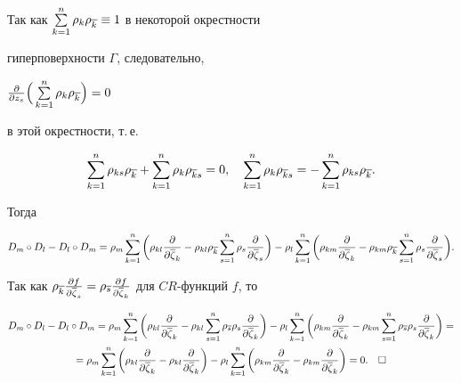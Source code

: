 Так как $\sum\limits_{k=1}^n\rho_k\rho_{\overline k}\equiv1$ в некоторой окрестности


гиперповерхности $\Gamma$, следовательно,\linebreak


$\frac{\partial}{\partial z_s}\Big(\sum\limits_{k=1}^n\rho_k\rho_{\ovl k}


\Big)=0$


в этой окрестности, т.\,е.


$$


\sum_{k=1}^n\rho_{ks}\rho_{\ovl k}+\sum_{k=1}^n\rho_k\rho_{\ovl ks}=0,\quad


\sum_{k=1}^n\rho_k\rho_{\ovl ks}=-\sum_{k=1}^n\rho_{ks}\rho_{\ovl k}.


$$


Тогда


$$


D_m\circ D_l-D_l\circ D_m=


\rho_m\sum_{k=1}^n\bigg(\rho_{kl}\frac{\partial}{\partial\ovl\zeta_k}


-\rho_{kl}\rho_{\ovl k}\sum_{s=1}^n\rho_s\frac{\partial}{\partial\ovl\zeta_s}


\bigg)-


\rho_l\sum_{k=1}^n\bigg(\rho_{km}\frac{\partial}{\partial\ovl\zeta_k}


-\rho_{km}\rho_{\ovl k}\sum_{s=1}^n\rho_s\frac{\partial}{\partial\ovl\zeta_s}


\bigg).


$$


Так как $\rho_{\ovl k}\frac{\partial f}{\partial\ovl\zeta_s}=\rho_{\ovl s}


\frac{\partial f}{\partial\ovl\zeta_k}$ для $CR$-функций $f$, то


\begin{multline*}


D_m\circ D_l-D_l\circ D_m=


\rho_m\sum_{k=1}^n\bigg(\rho_{kl}\frac{\partial}{\partial\ovl\zeta_k}


-\rho_{kl}\sum_{s=1}^n\rho_{\ovl s}\rho_s\frac{\partial}{\partial\ovl\zeta_k}


\bigg)-


\rho_l\sum_{k=1}^n\bigg(\rho_{km}\frac{\partial}{\partial\ovl\zeta_k}


-\rho_{km}\sum_{s=1}^n\rho_{\ovl s}\rho_s\frac{\partial}{\partial\ovl\zeta_k}


\bigg)=\\


=\rho_m\sum_{k=1}^n\bigg(\rho_{kl}\frac{\partial}{\partial\ovl\zeta_k}


-\rho_{kl}\frac{\partial}{\partial\ovl\zeta_k}\bigg)-


\rho_l\sum_{k=1}^n\bigg(\rho_{km}\frac{\partial}{\partial\ovl\zeta_k}


-\rho_{km}\frac{\partial}{\partial\ovl\zeta_k}\bigg)=0.\quad\square


\end{multline*}





